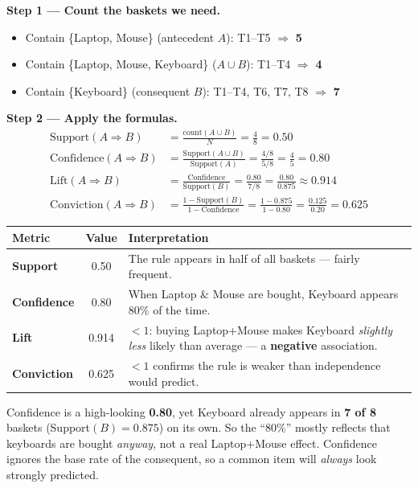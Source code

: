 \documentclass[11pt,a4paper]{article}
\begin{document}
\textbf{Step 1 --- Count the baskets we need.}
\begin{itemize}[leftmargin=*,topsep=1pt]
  \item Contain \{Laptop, Mouse\} (antecedent $A$): T1--T5 $\Rightarrow$ \textbf{5}
  \item Contain \{Laptop, Mouse, Keyboard\} ($A \cup B$): T1--T4 $\Rightarrow$ \textbf{4}
  \item Contain \{Keyboard\} (consequent $B$): T1--T4, T6, T7, T8 $\Rightarrow$ \textbf{7}
\end{itemize}

\textbf{Step 2 --- Apply the formulas.}
\begin{align*}
\text{Support}(A\Rightarrow B) &= \frac{\text{count}(A\cup B)}{N} = \frac{4}{8} = \mathbf{0.50}\\[4pt]
\text{Confidence}(A\Rightarrow B) &= \frac{\text{Support}(A\cup B)}{\text{Support}(A)} = \frac{4/8}{5/8} = \frac{4}{5} = \mathbf{0.80}\\[4pt]
\text{Lift}(A\Rightarrow B) &= \frac{\text{Confidence}}{\text{Support}(B)} = \frac{0.80}{7/8} = \frac{0.80}{0.875} \approx \mathbf{0.914}\\[4pt]
\text{Conviction}(A\Rightarrow B) &= \frac{1-\text{Support}(B)}{1-\text{Confidence}} = \frac{1-0.875}{1-0.80} = \frac{0.125}{0.20} = \mathbf{0.625}
\end{align*}

\begin{center}
\begin{tabular}{@{}>{\bfseries}p{2.6cm}cp{7.6cm}@{}}
\toprule
\rowcolor{primary!15}
\textbf{Metric} & \textbf{Value} & \textbf{Interpretation} \\
\midrule
Support & 0.50 & The rule appears in half of all baskets --- fairly frequent. \\
Confidence & 0.80 & When Laptop \& Mouse are bought, Keyboard appears 80\% of the time. \\
Lift & 0.914 & $<1$: buying Laptop+Mouse makes Keyboard \emph{slightly less} likely than average --- a \textbf{negative} association. \\
Conviction & 0.625 & $<1$ confirms the rule is weaker than independence would predict. \\
\bottomrule
\end{tabular}
\end{center}

\begin{warnbox}
Confidence is a high-looking \textbf{0.80}, yet Keyboard already appears in \textbf{7 of 8} baskets (Support$(B)=0.875$) on its own. So the ``80\%'' mostly reflects that keyboards are bought \emph{anyway}, not a real Laptop+Mouse effect. Confidence ignores the base rate of the consequent, so a common item will \emph{always} look strongly predicted.
\end{warnbox}
\end{document}
